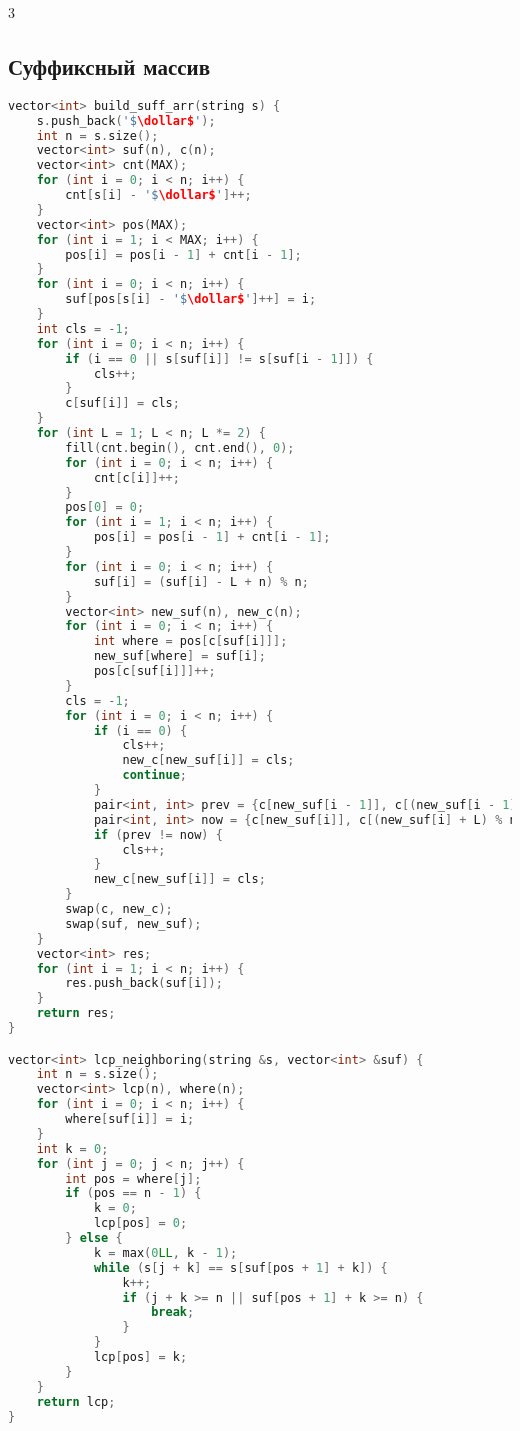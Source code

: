 \documentclass[10pt,a4paper,landscape,twosided]{extarticle}
\newcommand{\dollar}{\mbox{\textdollar}}
\begin{document}
\begin{multicols}{3}
\subsection{Суффиксный массив}
\begin{lstlisting}[language=C++]
vector<int> build_suff_arr(string s) {
    s.push_back('$\dollar$');
    int n = s.size();
    vector<int> suf(n), c(n);
    vector<int> cnt(MAX);
    for (int i = 0; i < n; i++) {
        cnt[s[i] - '$\dollar$']++;
    }
    vector<int> pos(MAX);
    for (int i = 1; i < MAX; i++) {
        pos[i] = pos[i - 1] + cnt[i - 1];
    }
    for (int i = 0; i < n; i++) {
        suf[pos[s[i] - '$\dollar$']++] = i;
    }
    int cls = -1;
    for (int i = 0; i < n; i++) {
        if (i == 0 || s[suf[i]] != s[suf[i - 1]]) {
            cls++;
        }
        c[suf[i]] = cls;
    }
    for (int L = 1; L < n; L *= 2) {
        fill(cnt.begin(), cnt.end(), 0);
        for (int i = 0; i < n; i++) {
            cnt[c[i]]++;
        }
        pos[0] = 0;
        for (int i = 1; i < n; i++) {
            pos[i] = pos[i - 1] + cnt[i - 1];
        }
        for (int i = 0; i < n; i++) {
            suf[i] = (suf[i] - L + n) % n;
        }
        vector<int> new_suf(n), new_c(n);
        for (int i = 0; i < n; i++) {
            int where = pos[c[suf[i]]];
            new_suf[where] = suf[i];
            pos[c[suf[i]]]++;
        }
        cls = -1;
        for (int i = 0; i < n; i++) {
            if (i == 0) {
                cls++;
                new_c[new_suf[i]] = cls;
                continue;
            }
            pair<int, int> prev = {c[new_suf[i - 1]], c[(new_suf[i - 1] + L) % n]};
            pair<int, int> now = {c[new_suf[i]], c[(new_suf[i] + L) % n]};
            if (prev != now) {
                cls++;
            }
            new_c[new_suf[i]] = cls;
        }
        swap(c, new_c);
        swap(suf, new_suf);
    }
    vector<int> res;
    for (int i = 1; i < n; i++) {
        res.push_back(suf[i]);
    }
    return res;
}

vector<int> lcp_neighboring(string &s, vector<int> &suf) {
    int n = s.size();
    vector<int> lcp(n), where(n);
    for (int i = 0; i < n; i++) {
        where[suf[i]] = i;
    }
    int k = 0;
    for (int j = 0; j < n; j++) {
        int pos = where[j];
        if (pos == n - 1) {
            k = 0;
            lcp[pos] = 0;
        } else {
            k = max(0LL, k - 1);
            while (s[j + k] == s[suf[pos + 1] + k]) {
                k++;
                if (j + k >= n || suf[pos + 1] + k >= n) {
                    break;
                }
            }
            lcp[pos] = k;
        }
    }
    return lcp;
}


\end{lstlisting}
\end{multicols}
\end{document}
